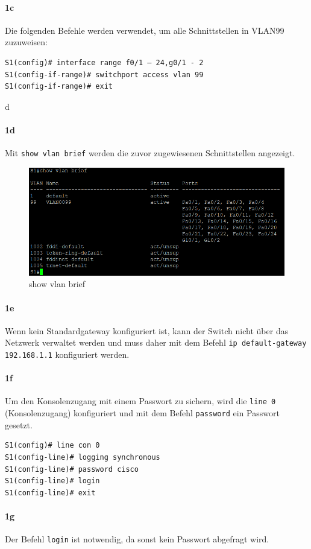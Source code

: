 \documentclass[a4paper]{article}
\newcommand{\abc}{\hfill \break}
\begin{document}
\paragraph {1c} \abc
Die folgenden Befehle werden verwendet, um alle Schnittstellen in VLAN99 zuzuweisen:
\begin{lstlisting}
S1(config)# interface range f0/1 – 24,g0/1 - 2
S1(config-if-range)# switchport access vlan 99
S1(config-if-range)# exit
\end{lstlisting}
d
\paragraph {1d} \abc
Mit \texttt{show vlan brief} werden die zuvor zugewiesenen Schnittstellen angezeigt.
\begin{figure}[h]
	\centering
	\includegraphics[scale=0.4]{images/show-vlan-brief.png}
	\caption{show vlan brief}
\end{figure}
\paragraph {1e} \abc
Wenn kein Standardgateway konfiguriert ist, kann der Switch nicht über das Netzwerk verwaltet werden und muss daher mit dem Befehl \texttt{ip default-gateway 192.168.1.1} konfiguriert werden.
\paragraph {1f} \abc
Um den Konsolenzugang mit einem Passwort zu sichern, wird die \texttt{line 0} (Konsolenzugang) konfiguriert und mit dem Befehl \texttt{password} ein Passwort gesetzt.
\begin{lstlisting}
S1(config)# line con 0
S1(config-line)# logging synchronous
S1(config-line)# password cisco
S1(config-line)# login
S1(config-line)# exit
\end{lstlisting}
\paragraph {1g} \abc
Der Befehl \texttt{login} ist notwendig, da sonst kein Passwort abgefragt wird.
\end{document}
